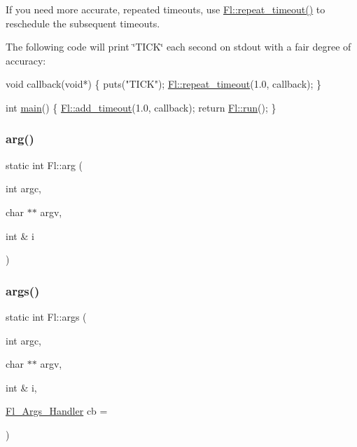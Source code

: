If you need more accurate, repeated timeouts, use \hyperlink{class_fl_af37afc5d555c5b213023d7a26cae1706}{Fl\+::repeat\+\_\+timeout()} to reschedule the subsequent timeouts.

The following code will print \char`\"{}\+T\+I\+C\+K\char`\"{} each second on stdout with a fair degree of accuracy\+:


\begin{DoxyCode}
\textcolor{keywordtype}{void} callback(\textcolor{keywordtype}{void}*) \{
  puts(\textcolor{stringliteral}{"TICK"});
  \hyperlink{class_fl_af37afc5d555c5b213023d7a26cae1706}{Fl::repeat\_timeout}(1.0, callback);
\}

\textcolor{keywordtype}{int} \hyperlink{main_8cpp_ae66f6b31b5ad750f1fe042a706a4e3d4}{main}() \{
  \hyperlink{class_fl_a6a7f66c2bb04c04cb5252c0466f87022}{Fl::add\_timeout}(1.0, callback);
  \textcolor{keywordflow}{return} \hyperlink{class_fl_aaa544fdb18c1f31c96225f379335e72f}{Fl::run}();
\}
\end{DoxyCode}
 \mbox{\label{class_fl_a746021246ddda071c5414064e536f988}} 
\subsubsection{\texorpdfstring{arg()}{arg()}}
{\footnotesize\ttfamily static int Fl\+::arg (\begin{DoxyParamCaption}\item[{int}]{argc,  }\item[{char $\ast$$\ast$}]{argv,  }\item[{int \&}]{i }\end{DoxyParamCaption})\hspace{0.3cm}{\ttfamily [static]}}

\mbox{\label{class_fl_a57d6ddce4c9669fef6b8973b5cc916bd}} 
\subsubsection{\texorpdfstring{args()}{args()}\hspace{0.1cm}{\footnotesize\ttfamily [1/2]}}
{\footnotesize\ttfamily static int Fl\+::args (\begin{DoxyParamCaption}\item[{int}]{argc,  }\item[{char $\ast$$\ast$}]{argv,  }\item[{int \&}]{i,  }\item[{\hyperlink{group__callback__functions_ga6cb5354ccaa2a6619f2408dbb5203f3b}{Fl\+\_\+\+Args\+\_\+\+Handler}}]{cb = {} }\end{DoxyParamCaption})\hspace{0.3cm}{\ttfamily [static]}}

